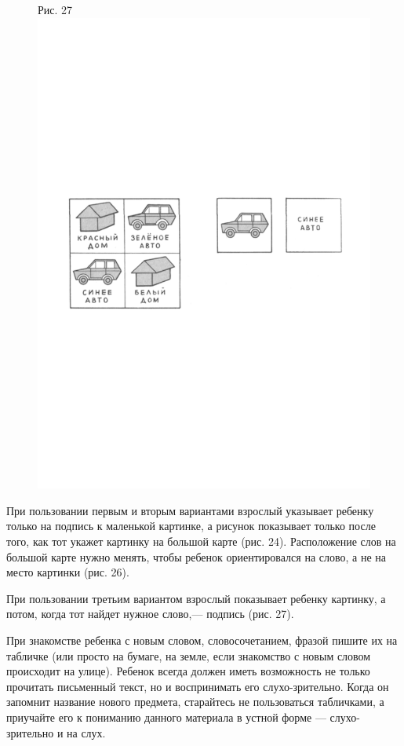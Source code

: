 \documentclass[a5paper]{book}
\begin{document}
\begin{figure}
\centering
Рис. 27\includegraphics[width=\linewidth]{media/media/image24.png}
\end{figure}

При пользовании первым и вторым вариантами взрослый указывает ребенку
только на подпись к маленькой картинке, а рисунок показывает только
после того, как тот укажет картинку на большой карте (рис. 24).
Расположение слов на большой карте нужно менять, чтобы ребенок
ориентировался на слово, а не на место картинки (рис. 26).

При пользовании третьим вариантом взрослый показывает ребенку картинку,
а потом, когда тот найдет нужное слово,--- подпись (рис. 27).

При знакомстве ребенка с новым словом, словосочетанием, фразой пишите их
на табличке (или просто на бумаге, на земле, если знакомство с новым
словом происходит на улице). Ребенок всегда должен иметь возможность не
только прочитать письменный текст, но и воспринимать его
слухо-зрительно. Когда он запомнит название нового предмета, старайтесь
не пользоваться табличками, а приучайте его к пониманию данного
материала в устной форме --- слухо-зрительно и на слух.
\end{document}
